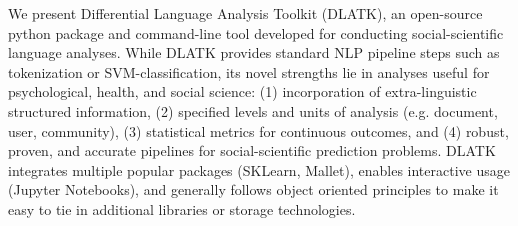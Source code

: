 We present Differential Language Analysis Toolkit (DLATK), an open-source python package and command-line tool developed for conducting social-scientific language analyses. While DLATK provides standard NLP pipeline steps such as tokenization or SVM-classification, its novel strengths lie in analyses useful for psychological, health, and social science: (1) incorporation of extra-linguistic structured information, (2) specified levels and units of analysis (e.g. document, user, community), (3) statistical metrics for continuous outcomes, and (4) robust, proven, and accurate pipelines for social-scientific prediction problems. DLATK integrates multiple popular packages (SKLearn, Mallet), enables interactive usage (Jupyter Notebooks), and generally follows object oriented principles to make it easy to tie in additional libraries or storage technologies.
